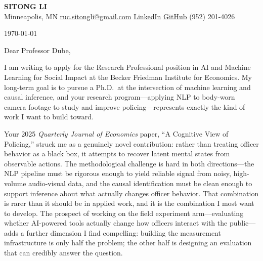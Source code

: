 \documentclass[12pt]{article}
\begin{document}
\begin{center}
  {\LARGE\textbf{\textcolor{accent}{SITONG LI}}} \\[4pt]
  \small Minneapolis, MN
  \;\textbullet\;
  \href{mailto:ruc.sitongli@gmail.com}{ruc.sitongli@gmail.com}
  \;\textbullet\;
  \href{https://linkedin.com/in/YOURHANDLE}{LinkedIn}   %
  \;\textbullet\;
  \href{https://github.com/YOURHANDLE}{GitHub}          %
  \;\textbullet\;
  (952) 201-4026
\end{center}

\vspace{1em}

\noindent \today

\vspace{1em}

\noindent Dear Professor Dube,

\vspace{1em}

I am writing to apply for the Research Professional position in AI and Machine
Learning for Social Impact at the Becker Friedman Institute for Economics. My
long-term goal is to pursue a Ph.D.\ at the intersection of machine learning and
causal inference, and your research program---applying NLP to body-worn camera
footage to study and improve policing---represents exactly the kind of work I want
to build toward.

Your 2025 \textit{Quarterly Journal of Economics} paper, ``A Cognitive View of
Policing,'' struck me as a genuinely novel contribution: rather than treating
officer behavior as a black box, it attempts to recover latent mental states from
observable actions. The methodological challenge is hard in both directions---the
NLP pipeline must be rigorous enough to yield reliable signal from noisy, high-volume
audio-visual data, and the causal identification must be clean enough to support
inference about what actually changes officer behavior. That combination is rarer
than it should be in applied work, and it is the combination I most want to develop.
The prospect of working on the field experiment arm---evaluating whether
AI-powered tools actually change how officers interact with the public---adds
a further dimension I find compelling: building the measurement infrastructure is
only half the problem; the other half is designing an evaluation that can
credibly answer the question.
\end{document}
